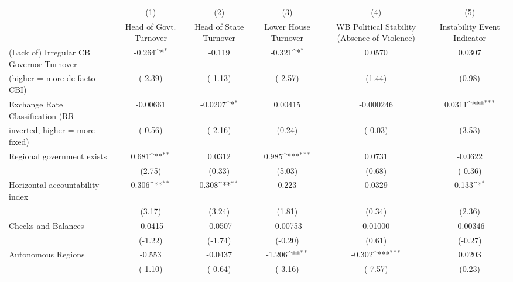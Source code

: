 {
\def\sym#1{\ifmmode^{#1}\else\(^{#1}\)\fi}
\begin{tabular}{l*{5}{c}}
\toprule
                                        &\multicolumn{1}{c}{(1)}&\multicolumn{1}{c}{(2)}&\multicolumn{1}{c}{(3)}&\multicolumn{1}{c}{(4)}&\multicolumn{1}{c}{(5)}\\
                                        &\multicolumn{1}{c}{Head of Govt. Turnover}&\multicolumn{1}{c}{Head of State Turnover}&\multicolumn{1}{c}{Lower House Turnover}&\multicolumn{1}{c}{WB Political Stability (Absence of Violence)}&\multicolumn{1}{c}{Instability Event Indicator}\\
\midrule
(Lack of) Irregular CB Governor Turnover&-0.264\sym{*}  &-0.119         &-0.321\sym{*}  &0.0570         &0.0307         \\
(higher = more de facto CBI)            &(-2.39)         &(-1.13)         &(-2.57)         &(1.44)         &(0.98)         \\
\addlinespace
Exchange Rate Classification (RR        &-0.00661         &-0.0207\sym{*}  &0.00415         &-0.000246         &0.0311\sym{***}\\
inverted, higher = more fixed)          &(-0.56)         &(-2.16)         &(0.24)         &(-0.03)         &(3.53)         \\
\addlinespace
Regional government exists              &0.681\sym{**} &0.0312         &0.985\sym{***}&0.0731         &-0.0622         \\
                                        &(2.75)         &(0.33)         &(5.03)         &(0.68)         &(-0.36)         \\
\addlinespace
Horizontal accountability index         &0.306\sym{**} &0.308\sym{**} &0.223         &0.0329         &0.133\sym{*}  \\
                                        &(3.17)         &(3.24)         &(1.81)         &(0.34)         &(2.36)         \\
\addlinespace
Checks and Balances                     &-0.0415         &-0.0507         &-0.00753         &0.01000         &-0.00346         \\
                                        &(-1.22)         &(-1.74)         &(-0.20)         &(0.61)         &(-0.27)         \\
\addlinespace
Autonomous Regions                      &-0.553         &-0.0437         &-1.206\sym{**} &-0.302\sym{***}&0.0203         \\
                                        &(-1.10)         &(-0.64)         &(-3.16)         &(-7.57)         &(0.23)         \\

\end{tabular}}

